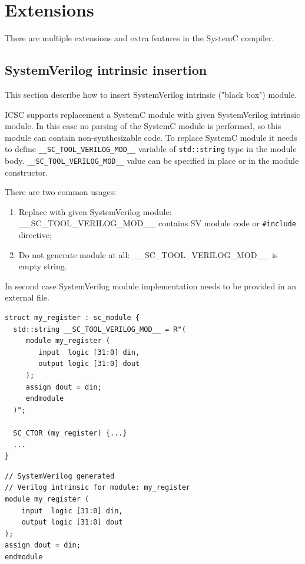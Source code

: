 \ifdefined\INTEL
\else
\section{Extensions}\label{section:extensions}

There are multiple extensions and extra features in the SystemC compiler.
\fi

\subsection{SystemVerilog intrinsic insertion}\label{section:black_box}

This section describe how to insert SystemVerilog intrinsic ("black box") module.

ICSC supports replacement a SystemC module with given SystemVerilog intrinsic module. In this case no parsing of the SystemC module is performed, so this module can contain non-synthesizable code. To replace SystemC module it needs to define {\tt \_\_SC\_TOOL\_VERILOG\_MOD\_\_} variable of {\tt std::string} type in the module body.
{\tt \_\_SC\_TOOL\_VERILOG\_MOD\_\_} value can be specified in place or in the module constructor.

There are two common usages:
\begin{enumerate}
\item Replace with given SystemVerilog module: \_\_SC\_TOOL\_VERILOG\_MOD\_\_ contains SV module code or {\tt \#include} directive;
\item Do not generate module at all: \_\_SC\_TOOL\_VERILOG\_MOD\_\_ is empty string. 
\end{enumerate}
%
In second case SystemVerilog module implementation needs to be provided in an external file.

\begin{lstlisting}[style=mycpp]
struct my_register : sc_module {
  std::string __SC_TOOL_VERILOG_MOD__ = R"(
     module my_register (
        input  logic [31:0] din,
        output logic [31:0] dout
     );
     assign dout = din;
     endmodule
  )";

  SC_CTOR (my_register) {...}
  ...
}
\end{lstlisting}
%
\begin{lstlisting}[style=mycpp]
// SystemVerilog generated
// Verilog intrinsic for module: my_register 
module my_register (
    input  logic [31:0] din,
    output logic [31:0] dout
);
assign dout = din;
endmodule
\end{lstlisting}



